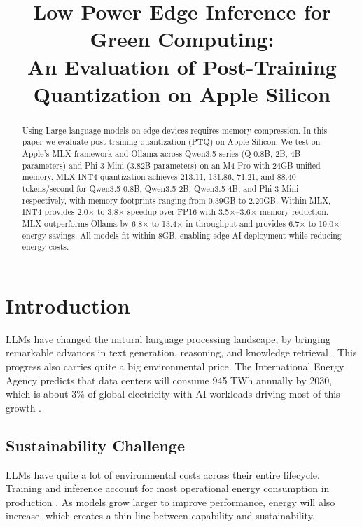 \documentclass[conference]{IEEEtran}
\title{Low Power Edge Inference for Green Computing: \\
An Evaluation of Post-Training Quantization on Apple Silicon}
\author{
    \IEEEauthorblockN{Harshpreet Singh}
    \IEEEauthorblockA{Chitkara University, India\\
    harshpreet393.be22@chitkara.edu.in}
    \and
    \IEEEauthorblockN{Sameer Kumar}
    \IEEEauthorblockA{Chitkara University, India\\
    sameer776.be22@chitkara.edu.in}
}
\date{}
\begin{document}
\maketitle

\begin{abstract}
\noindent Using Large language models on edge devices requires memory compression. In this paper we evaluate post training quantization (PTQ) on Apple Silicon. We test on Apple's MLX framework and Ollama across Qwen3.5 series (Q-0.8B, 2B, 4B parameters) and Phi-3 Mini (3.82B parameters) on an M4 Pro with 24GB unified memory. MLX INT4 quantization achieves 213.11, 131.86, 71.21, and 88.40 tokens/second for Qwen3.5-0.8B, Qwen3.5-2B, Qwen3.5-4B, and Phi-3 Mini respectively, with memory footprints ranging from 0.39GB to 2.20GB. Within MLX, INT4 provides 2.0$\times$ to 3.8$\times$ speedup over FP16 with 3.5$\times$--3.6$\times$ memory reduction. MLX outperforms Ollama by 6.8$\times$ to 13.4$\times$ in throughput and provides 6.7$\times$ to 19.0$\times$ energy savings. All models fit within 8GB, enabling edge AI deployment while reducing energy costs.
\end{abstract}

\section{Introduction}

LLMs have changed the natural language processing landscape, by bringing remarkable advances in text generation, reasoning, and knowledge retrieval \cite{brown2020language, openai2023gpt4}. This progress also carries quite a big environmental price. The International Energy Agency predicts that data centers will consume 945 TWh annually by 2030, which is about 3\% of global electricity with AI workloads driving most of this growth \cite{iea2025energyai}.

\subsection{Sustainability Challenge}

LLMs have quite a lot of environmental costs across their entire lifecycle. Training and inference account for most operational energy consumption in production \cite{patterson2021carbon}. As models grow larger to improve performance, energy will also increase, which creates a thin line between capability and sustainability.
\end{document}
